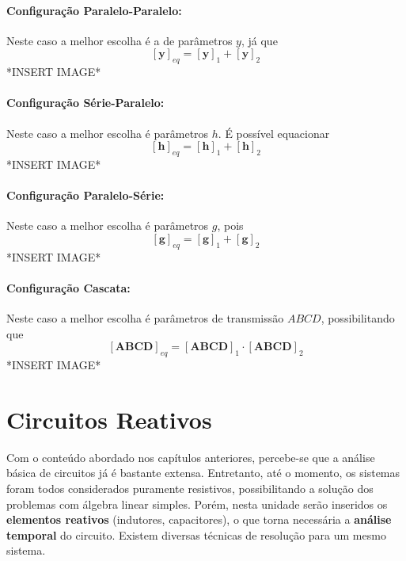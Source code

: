 \documentclass{article}
\numberwithin{equation}{section}
\begin{document}
    \paragraph{Configuração Paralelo-Paralelo:}
    Neste caso a melhor escolha é a de parâmetros $y$, já que
        $$ [\textbf{y}]_{eq} = [\textbf{y}]_{1} + [\textbf{y}]_{2} $$
        *INSERT IMAGE*

    \paragraph{Configuração Série-Paralelo:}
    Neste caso a melhor escolha é parâmetros $h$. É possível equacionar
        $$ [\textbf{h}]_{eq} = [\textbf{h}]_{1} + [\textbf{h}]_{2} $$
        *INSERT IMAGE*

    \paragraph{Configuração Paralelo-Série:}
    Neste caso a melhor escolha é parâmetros $g$, pois
        $$ [\textbf{g}]_{eq} = [\textbf{g}]_{1} + [\textbf{g}]_{2} $$
        *INSERT IMAGE*

    \paragraph{Configuração Cascata:}
    Neste caso a melhor escolha é parâmetros de transmissão $ABCD$, possibilitando que
        $$ [\textbf{ABCD}]_{eq} = [\textbf{ABCD}]_{1} \cdot [\textbf{ABCD}]_{2} $$
        *INSERT IMAGE*

    \newpage



    \section{Circuitos Reativos}
    \label{sec:reativos}
    Com o conteúdo abordado nos capítulos anteriores, percebe-se que a análise básica de circuitos já é bastante extensa. Entretanto, até o momento, os sistemas foram todos considerados puramente resistivos, possibilitando a solução dos problemas com álgebra linear simples. Porém, nesta unidade serão inseridos os \textbf{elementos reativos} (indutores, capacitores), o que torna necessária a \textbf{análise temporal} do circuito. Existem diversas técnicas de resolução para um mesmo sistema.
\end{document}
